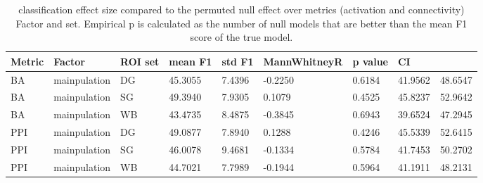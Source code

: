 \begin{table}
\centering
\begin{tabular}[0.2em]{@{}lllllllll@{}}\toprule
Metric & Factor & ROI set & mean F1 & std F1 & MannWhitneyR & p value & CI\\\toprule[0.2em]
BA & mainpulation & DG & 45.3055 & 7.4396 & -0.2250 & 0.6184 & 41.9562 & 48.6547 \\\midrule
BA & mainpulation & SG & 49.3940 & 7.9305 & 0.1079 & 0.4525 & 45.8237 & 52.9642 \\\midrule
BA & mainpulation & WB & 43.4735 & 8.4875 & -0.3845 & 0.6943 & 39.6524 & 47.2945 \\\midrule
PPI & mainpulation & DG & 49.0877 & 7.8940 & 0.1288 & 0.4246 & 45.5339 & 52.6415 \\\midrule
PPI & mainpulation & SG & 46.0078 & 9.4681 & -0.1334 & 0.5784 & 41.7453 & 50.2702 \\\midrule
PPI & mainpulation & WB & 44.7021 & 7.7989 & -0.1944 & 0.5964 & 41.1911 & 48.2131 \\\bottomrule[0.2em]
\end{tabular}
\caption{classification effect size compared to the permuted null effect over metrics (activation and connectivity) Factor and set. Empirical p is calculated as the number of null models that are better than the mean F1 score of the true model.\label{tabel:ClassificationManipEffect}}
\end{table}
